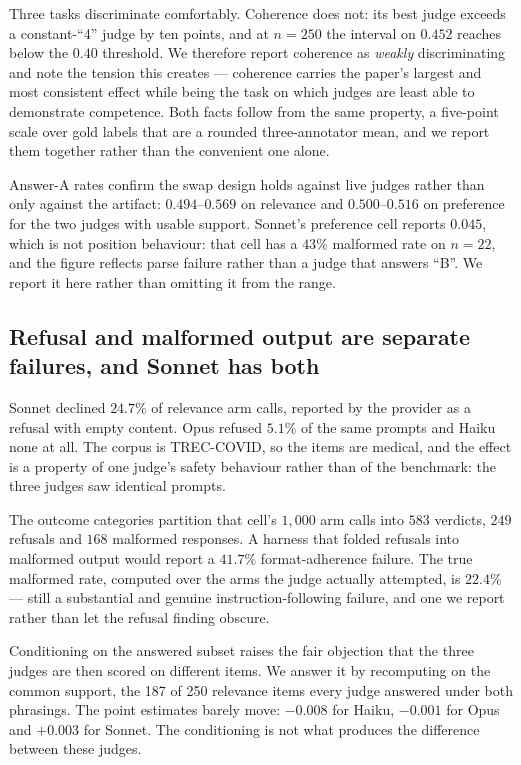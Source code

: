 Three tasks discriminate comfortably. Coherence does not: its best judge exceeds
a constant-``4'' judge by ten points, and at $n=250$ the interval on $0.452$
reaches below the $0.40$ threshold. We therefore report coherence as
\emph{weakly} discriminating and note the tension this creates --- coherence
carries the paper's largest and most consistent effect while being the task on
which judges are least able to demonstrate competence. Both facts follow from
the same property, a five-point scale over gold labels that are a rounded
three-annotator mean, and we report them together rather than the convenient one
alone.

Answer-A rates confirm the swap design holds against live judges rather than only
against the artifact: $0.494$--$0.569$ on relevance and $0.500$--$0.516$ on
preference for the two judges with usable support. Sonnet's preference cell
reports $0.045$, which is not position behaviour: that cell has a $43\%$
malformed rate on $n=22$, and the figure reflects parse failure rather than a
judge that answers ``B''. We report it here rather than omitting it from the
range.

\subsection{Refusal and malformed output are separate failures, and Sonnet has both}
\label{sec:results-refusal}

Sonnet declined $24.7\%$ of relevance arm calls, reported by the provider as a
refusal with empty content. Opus refused $5.1\%$ of the same prompts and Haiku
none at all. The corpus is TREC-COVID, so the items are medical, and the effect
is a property of one judge's safety behaviour rather than of the benchmark: the
three judges saw identical prompts.

The outcome categories partition that cell's $1{,}000$ arm calls into $583$
verdicts, $249$ refusals and $168$ malformed responses. A harness that folded
refusals into malformed output would report a $41.7\%$ format-adherence failure.
The true malformed rate, computed over the arms the judge actually attempted, is
$22.4\%$ --- still a substantial and genuine instruction-following failure, and
one we report rather than let the refusal finding obscure.

Conditioning on the answered subset raises the fair objection that the three
judges are then scored on different items. We answer it by recomputing on the
common support, the 187 of 250 relevance items every judge answered under both
phrasings. The point estimates barely move: $-0.008$ for Haiku, $-0.001$ for
Opus and $+0.003$ for Sonnet. The conditioning is not what produces the
difference between these judges.


